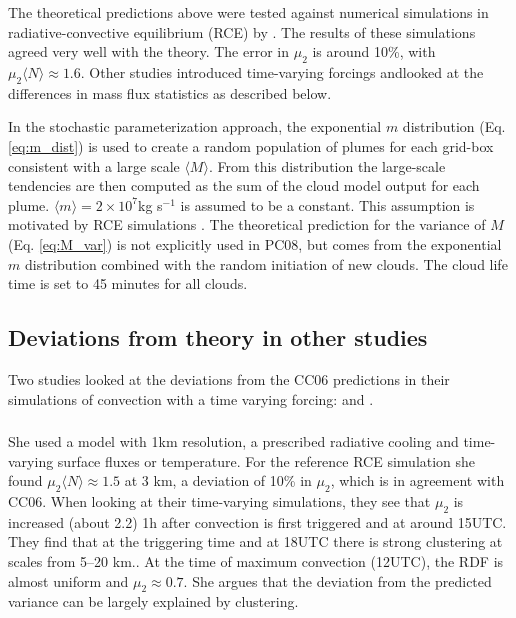 \documentclass[a4paper, 12pt]{article}
\begin{document}
The theoretical predictions above were tested against numerical simulations in radiative-convective equilibrium (RCE) by \cite{Cohen2006}. The results of these simulations agreed very well with the theory. The error in $\mu_2$ is around 10\%, with $\mu_2 \langle N \rangle \approx 1.6$. Other studies introduced time-varying forcings andlooked at the differences in mass flux statistics as described below.

In the \cite[][PC08]{Plant2008} stochastic parameterization approach, the exponential $m$ distribution (Eq. \ref{eq:m_dist}) is used to create a random population of plumes for each grid-box consistent with a large scale $\langle M \rangle$. From this distribution the large-scale tendencies are then computed as the sum of the cloud model output for each plume. $\langle m \rangle = 2 \times 10^7$kg s$^{-1}$ is assumed to be a constant. This assumption is motivated by RCE simulations \citep[e.g.][]{Cohen2006}. The theoretical prediction for the variance of $M$ (Eq. \ref{eq:M_var}) is not explicitly used in PC08, but comes from the exponential $m$ distribution combined with the random initiation of new clouds. The cloud life time is set to 45 minutes for all clouds. 

\subsection{Deviations from theory in other studies}
Two studies looked at the deviations from the CC06 predictions in their simulations of convection with a time varying forcing: \cite{Davies2008} and \cite{Davoudi2010}.

\subsubsection{\cite{Davies2008}}
She used a model with 1km resolution, a prescribed radiative cooling and time-varying surface fluxes or temperature. For the reference RCE simulation she found $\mu_2 \langle N \rangle \approx 1.5$ at 3 km, a deviation of 10\% in $\mu_2$, which is in agreement with CC06. When looking at their time-varying simulations, they see that $\mu_2$ is increased (about 2.2) 1h after convection is first triggered and at around 15UTC. They find that at the triggering time and at 18UTC there is strong clustering at scales from 5--20 km.. At the time of maximum convection (12UTC), the RDF is almost uniform and $\mu_2 \approx 0.7$. She argues that the deviation from the predicted variance can be largely explained by clustering. 
\end{document}
